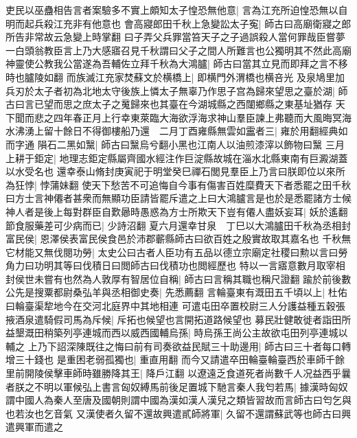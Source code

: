 吏民以巫蠱相告言者案驗多不實上頗知太子惶恐無他意|{
	言為江充所迫惶恐無以自明而起兵殺江充非有他意也}
會高寢郎田千秋上急變訟太子寃|{
	師古曰高廟衛寢之郎所告非常故云急變上時掌翻}
曰子弄父兵罪當笞天子之子過誤殺人當何罪哉臣嘗夢一白頭翁教臣言上乃大感寤召見千秋謂曰父子之間人所難言也公獨明其不然此高廟神靈使公教我公當遂為吾輔佐立拜千秋為大鴻臚|{
	師古曰當其立見而即拜之言不移時也臚陵如翻}
而族滅江充家焚蘇文於横橋上|{
	即横門外渭橋也横咅光}
及泉鳩里加兵刃於太子者初為北地太守後族上憐太子無辜乃作思子宫為歸來望思之臺於湖|{
	師古曰言已望而思之庶太子之䰟歸來也其臺在今湖城縣之西闥鄉縣之東基址猶存}
天下聞而悲之四年春正月上行幸東萊臨大海欲浮海求神山羣臣諫上弗聽而大風晦冥海水沸湧上留十餘日不得御樓船乃還　二月丁酉雍縣無雲如靁者三|{
	雍於用翻經典如而字通}
隕石二黑如黳|{
	師古曰黳烏兮翻小黑也江南人以油煎漆滓以飾物曰黳}
三月上耕于鉅定|{
	地理志鉅定縣屬齊國水經注作巨淀縣故城在淄水北縣東南有巨澱湖蓋以水受名也}
還幸泰山脩封庚寅祀于明堂癸巳禪石閭見羣臣上乃言曰朕即位以來所為狂悖|{
	悖蒲妹翻}
使天下愁苦不可追悔自今事有傷害百姓糜費天下者悉罷之田千秋曰方士言神僊者甚衆而無顯功臣請皆罷斥遣之上曰大鴻臚言是也於是悉罷諸方士候神人者是後上每對群臣自歎曏時愚惑為方士所欺天下豈有僊人盡妖妄耳|{
	妖於遙翻}
節食服藥差可少病而已|{
	少詩沼翻}
夏六月還幸甘泉　丁巳以大鴻臚田千秋為丞相封富民侯|{
	恩澤侯表富民侯食邑於沛郡蘄縣師古曰欲百姓之殷實故取其嘉名也}
千秋無它材能又無伐閱功勞|{
	太史公曰古者人臣功有五品以德立宗廟定社稷曰勲以言曰勞角力曰功明其等曰伐積日曰閲師古曰伐積功也閲經歷也}
特以一言寤意數月取宰相封侯世未嘗有也然為人敦厚有智居位自稱|{
	師古曰言稱其職也稱尺證翻}
踰於前後數公先是搜粟都尉桑弘羊與丞相御史奏|{
	先悉薦翻}
言輪臺東有溉田五千頃以上|{
	杜佑曰輪臺渠犂地今在交河北庭界中其地相連}
可遣屯田卒置校尉三人分護益種五穀張掖酒泉遣騎假司馬為斥候|{
	斥拓也候望也言開拓道路候望也}
募民壯健敢徙者詣田所益墾溉田稍築列亭連城而西以威西國輔烏孫|{
	時烏孫王尚公主故欲屯田列亭連城以輔之}
上乃下詔深陳既往之悔曰前有司奏欲益民賦三十助邊用|{
	師古曰三十者每口轉增三十錢也}
是重困老弱孤獨也|{
	重直用翻}
而今又請遣卒田輪臺輪臺西於車師千餘里前開陵侯擊車師時雖勝降其王|{
	降戶江翻}
以遼遠乏食道死者尚數千人况益西乎曩者朕之不明以軍候弘上書言匈奴縛馬前後足置城下馳言秦人我匄若馬|{
	據漢時匈奴謂中國人為秦人至唐及國朝則謂中國為漢如漢人漢兒之類皆習故而言師古曰匄乞與也若汝也乞音氣}
又漢使者久留不還故興遣貳師將軍|{
	久留不還謂蘇武等也師古曰興遣興軍而遣之}
